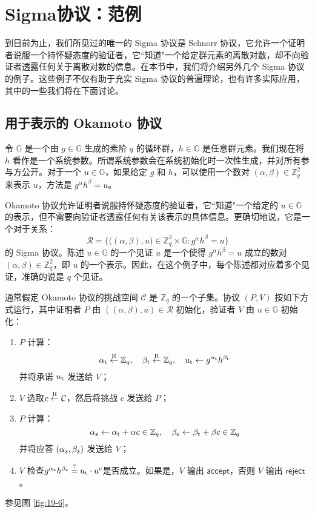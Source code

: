 \section{Sigma协议：范例}

到目前为止，我们所见过的唯一的 Sigma 协议是 Schnorr 协议，它允许一个证明者说服一个持怀疑态度的验证者，它``知道"一个给定群元素的离散对数，却不向验证者透露任何关于离散对数的信息。在本节中，我们将介绍另外几个 Sigma 协议的例子。这些例子不仅有助于充实 Sigma 协议的普遍理论，也有许多实际应用，其中的一些我们将在下面讨论。

\subsection{用于表示的 Okamoto 协议}\label{subsec:19-5-1}

令 $\mathbb{G}$ 是一个由 $g\in\mathbb{G}$ 生成的素阶 $q$ 的循环群，$h\in\mathbb{G}$ 是任意群元素。我们现在将 $h$ 看作是一个系统参数。所谓系统参数会在系统初始化时一次性生成，并对所有参与方公开。对于一个 $u\in\mathbb{G}$，如果给定 $g$ 和 $h$，可以使用一个数对 $(\alpha,\beta)\in\mathbb{Z}_q^2$ 来表示 $u$，方法是 $g^\alpha h^\beta=u$。

Okamoto 协议允许证明者说服持怀疑态度的验证者，它``知道"一个给定的 $u\in\mathbb{G}$ 的表示，但不需要向验证者透露任何有关该表示的具体信息。更确切地说，它是一个对于关系：
\begin{equation}\label{eq:19-11}
	\mathcal{R}=\bigg\lbrace
	\big((\alpha,\beta),u\big)\in\mathbb{Z}_q^2\times\mathbb{G}:g^\alpha h^\beta=u
	\bigg\rbrace
\end{equation}
的 Sigma 协议。陈述 $u\in\mathbb{G}$ 的一个见证 $u$ 是一个使得 $g^\alpha h^\beta=u$ 成立的数对 $(\alpha,\beta)\in\mathbb{Z}_q^2$，即 $u$ 的一个表示。因此，在这个例子中，每个陈述都对应着多个见证，准确的说是 $q$ 个见证。

通常假定 Okamoto 协议的挑战空间 $\mathcal{C}$ 是 $\mathbb{Z}_q$ 的一个子集。协议 $(P,V)$ 按如下方式运行，其中证明者 $P$ 由 $((\alpha,\beta),u)\in\mathcal{R}$ 初始化，验证者 $V$ 由 $u\in\mathbb{G}$ 初始化：
\begin{enumerate}
	\item $P$ 计算：
	\[
    \alpha_{\rm t}\overset{\rm R}\leftarrow\mathbb{Z}_q,
    \quad
    \beta_{\rm t}\overset{\rm R}\leftarrow\mathbb{Z}_q,
    \quad
    u_{\rm t}\leftarrow g^{\alpha_{\rm t}}h^{\beta_{\rm t}}
    \]
    并将承诺 $u_{\rm t}$ 发送给 $V$；
	\item $V$ 选取$c\overset{\rm R}\leftarrow\mathcal{C}$，然后将挑战 $c$ 发送给 $P$；
	\item $P$ 计算：
	\[
    \alpha_{\rm z}\leftarrow\alpha_{\rm t}+\alpha c\in\mathbb{Z}_q,
    \quad
    \beta_{\rm z}\leftarrow\beta_{\rm t}+\beta c\in\mathbb{Z}_q
    \]
    并将应答 $(\alpha_{\rm z}, \beta_{\rm z})$ 发送给 $V$；
	\item $V$ 检查$g^{\alpha_{\rm z}}h^{\beta_{\rm z}}\overset{?}=u_{\rm t}\cdot u^c$是否成立。如果是，$V$ 输出 $\mathsf{accept}$，否则 $V$ 输出 $\mathsf{reject}$。
\end{enumerate}
参见图 \ref{fig:19-6}。

